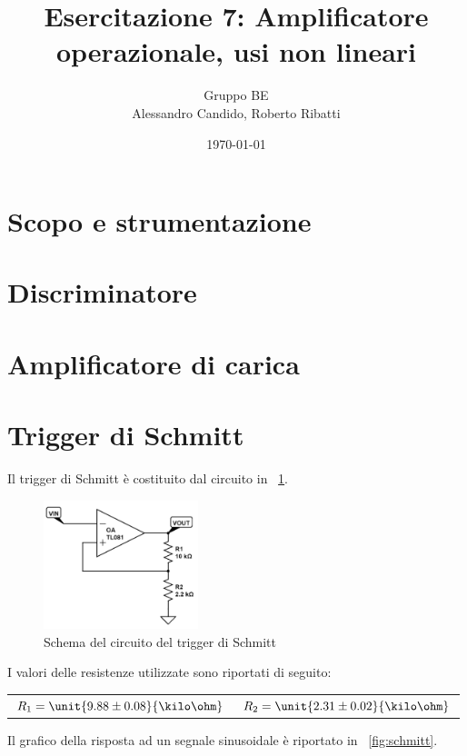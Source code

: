 \documentclass[10pt,a4paper]{article}
\title{Esercitazione 7: Amplificatore operazionale, usi non lineari}
\author{Gruppo BE \\ Alessandro Candido, Roberto Ribatti}
\date{\today}
\begin{document}
\maketitle

\section{Scopo e strumentazione}

\section{Discriminatore}

\section{Amplificatore di carica}

\section{Trigger di Schmitt}
Il trigger di Schmitt è costituito dal circuito in \figurename{~\ref{fig:schmitt_trigger}}.

\begin{figure}[H]
	\centering
	\includegraphics[width=0.40\textwidth]{../circuiti/schmitt_trigger.jpg}
	\caption{Schema del circuito del trigger di Schmitt}
	\label{fig:schmitt_trigger}
\end{figure}

I valori delle resistenze utilizzate sono riportati di seguito:

\begin{table}[H]
	\centering
	\begin{tabular}{cc}
        $ R_1 = \unit{9.88 \pm 0.08}{\kilo\ohm}$  & $R_2 = \unit{2.31 \pm 0.02}{\kilo\ohm}$
	\end{tabular}
\end{table}

Il grafico della risposta ad un segnale sinusoidale è riportato in \figurename{~\ref{fig:schmitt}}.
\end{document}
